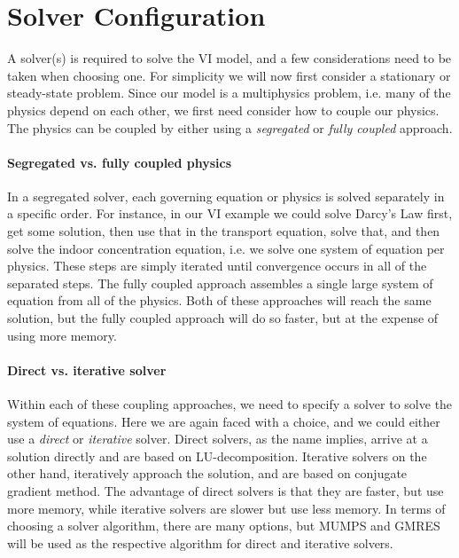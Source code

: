 \section{Solver Configuration}

A solver(s) is required to solve the VI model, and a few considerations need to be taken when choosing one.
For simplicity we will now first consider a stationary or steady-state problem.
Since our model is a multiphysics problem, i.e. many of the physics depend on each other, we first need consider how to couple our physics.
The physics can be coupled by either using a \textit{segregated} or \textit{fully coupled} approach.\par

\paragraph{Segregated vs. fully coupled physics}

In a segregated solver, each governing equation or physics is solved separately in a specific order.
For instance, in our VI example we could solve Darcy's Law first, get some solution, then use that in the transport equation, solve that, and then solve the indoor concentration equation, i.e. we solve one system of equation per physics.
These steps are simply iterated until convergence occurs in all of the separated steps.
The fully coupled approach assembles a single large system of equation from all of the physics.
Both of these approaches will reach the same solution, but the fully coupled approach will do so faster, but at the expense of using more memory.\par

\paragraph{Direct vs. iterative solver}

Within each of these coupling approaches, we need to specify a solver to solve the system of equations.
Here we are again faced with a choice, and we could either use a \textit{direct} or \textit{iterative} solver.
Direct solvers, as the name implies, arrive at a solution directly and are based on LU-decomposition.
Iterative solvers on the other hand, iteratively approach the solution, and are based on conjugate gradient method.
The advantage of direct solvers is that they are faster, but use more memory, while iterative solvers are slower but use less memory.
In terms of choosing a solver algorithm, there are many options, but MUMPS and GMRES will be used as the respective algorithm for direct and iterative solvers.\par

